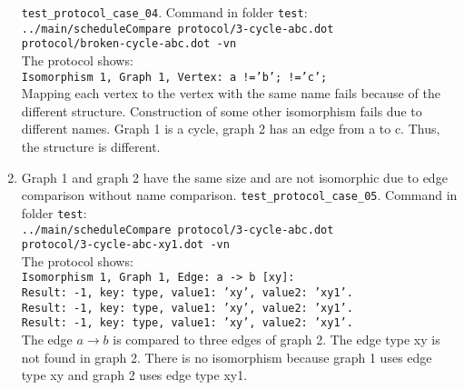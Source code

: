 \documentclass[12pt,a4paper]{report}
\begin{document}
\begin{enumerate}
    \texttt{test\_protocol\_case\_04}. Command in folder \texttt{test}: \\
    \texttt{../main/scheduleCompare protocol/3-cycle-abc.dot \\ protocol/broken-cycle-abc.dot -vn} \\
    The protocol shows: \\
    \texttt{Isomorphism 1, Graph 1, Vertex: a !='b'; !='c';} \\
    Mapping each vertex to the vertex with the same name fails because of the different structure.
    Construction of some other isomorphism fails due to different names.
    Graph 1 is a cycle, graph 2 has an edge from a to c. Thus, the structure is different.
  \item Graph 1 and graph 2 have the same size and are not isomorphic due to edge comparison without name comparison.
    \texttt{test\_protocol\_case\_05}. Command in folder \texttt{test}: \\
    \texttt{../main/scheduleCompare protocol/3-cycle-abc.dot \\ protocol/3-cycle-abc-xy1.dot -vn} \\
    The protocol shows: \\
    \texttt{Isomorphism 1, Graph 1, Edge: a -> b [xy]: \\ 
        Result: -1, key: type, value1: 'xy', value2: 'xy1'. \\
        Result: -1, key: type, value1: 'xy', value2: 'xy1'. \\ 
        Result: -1, key: type, value1: 'xy', value2: 'xy1'.} \\
    The edge $a \rightarrow b$ is compared to three edges of graph 2. The edge type xy is not found in graph 2.
    There is no isomorphism because graph 1 uses edge type xy and graph 2 uses edge type xy1.


\end{enumerate}
\end{document}
